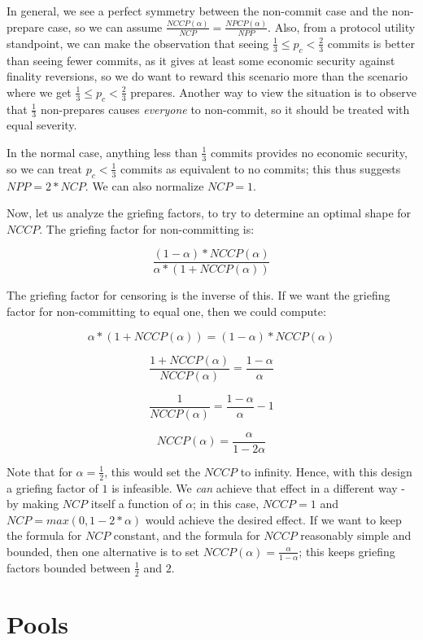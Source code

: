 \documentclass[12pt]{article}
\begin{document}
In general, we see a perfect symmetry between the non-commit case and the non-prepare case, so we can assume $\frac{NCCP(\alpha)}{NCP} = \frac{NPCP(\alpha)}{NPP}$. Also, from a protocol utility standpoint, we can make the observation that seeing $\frac{1}{3} \le p_c < \frac{2}{3}$ commits is better than seeing fewer commits, as it gives at least some economic security against finality reversions, so we do want to reward this scenario more than the scenario where we get $\frac{1}{3} \le p_c < \frac{2}{3}$ prepares. Another way to view the situation is to observe that $\frac{1}{3}$ non-prepares causes \textit{everyone} to non-commit, so it should be treated with equal severity.

In the normal case, anything less than $\frac{1}{3}$ commits provides no economic security, so we can treat $p_c < \frac{1}{3}$ commits as equivalent to no commits; this thus suggests $NPP = 2 * NCP$. We can also normalize $NCP = 1$.

Now, let us analyze the griefing factors, to try to determine an optimal shape for $NCCP$. The griefing factor for non-committing is:

$$\frac{(1-\alpha) * NCCP(\alpha)}{\alpha * (1 + NCCP(\alpha))}$$

The griefing factor for censoring is the inverse of this. If we want the griefing factor for non-committing to equal one, then we could compute:

$$\alpha * (1 + NCCP(\alpha)) = (1-\alpha) * NCCP(\alpha)$$

$$\frac{1 + NCCP(\alpha)}{NCCP(\alpha)} = \frac{1-\alpha}{\alpha}$$

$$\frac{1}{NCCP(\alpha)} = \frac{1-\alpha}{\alpha} - 1$$

$$NCCP(\alpha) = \frac{\alpha}{1-2\alpha}$$

Note that for $\alpha = \frac{1}{2}$, this would set the $NCCP$ to infinity. Hence, with this design a griefing factor of $1$ is infeasible. We \textit{can} achieve that effect in a different way - by making $NCP$ itself a function of $\alpha$; in this case, $NCCP = 1$ and $NCP = max(0, 1 - 2 * \alpha)$ would achieve the desired effect. If we want to keep the formula for $NCP$ constant, and the formula for $NCCP$ reasonably simple and bounded, then one alternative is to set $NCCP(\alpha) = \frac{\alpha}{1-\alpha}$; this keeps griefing factors bounded between $\frac{1}{2}$ and $2$.

\section{Pools}
\end{document}
